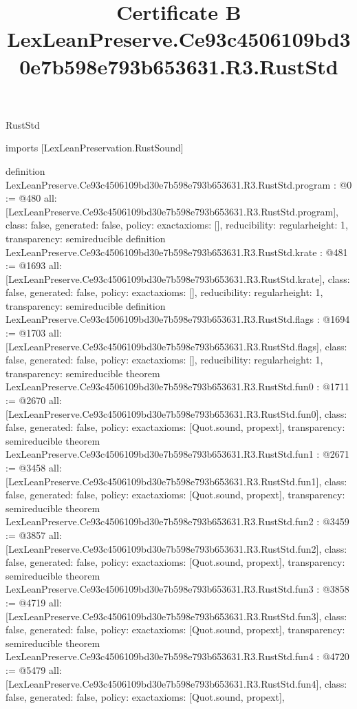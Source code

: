 \begin{lexlean}{RustStd}
\title{Certificate B LexLeanPreserve.Ce93c4506109bd30e7b598e793b653631.R3.RustStd}
\begin{coremodule}
imports [LexLeanPreservation.RustSound]

definition LexLeanPreserve.Ce93c4506109bd30e7b598e793b653631.R3.RustStd.program : @0 := @480 {
  all: [LexLeanPreserve.Ce93c4506109bd30e7b598e793b653631.R3.RustStd.program],
  class: false,
  generated: false,
  policy: exact{axioms: []},
  reducibility: regular{height: 1},
  transparency: semireducible
}
definition LexLeanPreserve.Ce93c4506109bd30e7b598e793b653631.R3.RustStd.krate : @481 := @1693 {
  all: [LexLeanPreserve.Ce93c4506109bd30e7b598e793b653631.R3.RustStd.krate],
  class: false,
  generated: false,
  policy: exact{axioms: []},
  reducibility: regular{height: 1},
  transparency: semireducible
}
definition LexLeanPreserve.Ce93c4506109bd30e7b598e793b653631.R3.RustStd.flags : @1694 := @1703 {
  all: [LexLeanPreserve.Ce93c4506109bd30e7b598e793b653631.R3.RustStd.flags],
  class: false,
  generated: false,
  policy: exact{axioms: []},
  reducibility: regular{height: 1},
  transparency: semireducible
}
theorem LexLeanPreserve.Ce93c4506109bd30e7b598e793b653631.R3.RustStd.fun0 : @1711 := @2670 {
  all: [LexLeanPreserve.Ce93c4506109bd30e7b598e793b653631.R3.RustStd.fun0],
  class: false,
  generated: false,
  policy: exact{axioms: [Quot.sound, propext]},
  transparency: semireducible
}
theorem LexLeanPreserve.Ce93c4506109bd30e7b598e793b653631.R3.RustStd.fun1 : @2671 := @3458 {
  all: [LexLeanPreserve.Ce93c4506109bd30e7b598e793b653631.R3.RustStd.fun1],
  class: false,
  generated: false,
  policy: exact{axioms: [Quot.sound, propext]},
  transparency: semireducible
}
theorem LexLeanPreserve.Ce93c4506109bd30e7b598e793b653631.R3.RustStd.fun2 : @3459 := @3857 {
  all: [LexLeanPreserve.Ce93c4506109bd30e7b598e793b653631.R3.RustStd.fun2],
  class: false,
  generated: false,
  policy: exact{axioms: [Quot.sound, propext]},
  transparency: semireducible
}
theorem LexLeanPreserve.Ce93c4506109bd30e7b598e793b653631.R3.RustStd.fun3 : @3858 := @4719 {
  all: [LexLeanPreserve.Ce93c4506109bd30e7b598e793b653631.R3.RustStd.fun3],
  class: false,
  generated: false,
  policy: exact{axioms: [Quot.sound, propext]},
  transparency: semireducible
}
theorem LexLeanPreserve.Ce93c4506109bd30e7b598e793b653631.R3.RustStd.fun4 : @4720 := @5479 {
  all: [LexLeanPreserve.Ce93c4506109bd30e7b598e793b653631.R3.RustStd.fun4],
  class: false,
  generated: false,
  policy: exact{axioms: [Quot.sound, propext]},
}
\end{coremodule}
\end{lexlean}
